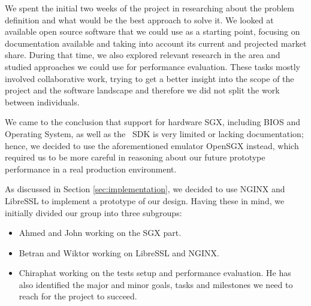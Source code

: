 \documentclass[../main.tex]{subfiles}
\begin{document}

We spent the initial two weeks of the project in researching about the problem
definition and what would be the best approach to solve it. We looked at
available open source software that we could use as a starting point, focusing
on documentation available and taking into account its current and projected
market share. During that time, we also explored relevant research in the area
and studied approaches we could use for performance evaluation. These tasks
mostly involved collaborative work, trying to get a better insight into the
scope of the project and the software landscape and therefore we did not split
the work between individuals.

We came to the conclusion that support for hardware SGX, including BIOS and
Operating System, as well as the \Intel~SDK is very limited or lacking
documentation; hence, we decided to use the aforementioned emulator OpenSGX
instead, which required us to be more careful in reasoning about our future
prototype performance in a real production environment.

As discussed in Section \ref{sec:implementation}, we decided to use NGINX and
LibreSSL to implement a prototype of our design. Having these in
mind, we initially divided our group into three subgroups:

\begin{itemize}
	\item Ahmed and John working on the SGX part.
	\item Betran and Wiktor working on LibreSSL and NGINX.
	\item Chiraphat working on the tests setup and performance evaluation.
          He has also identified the major and minor goals, tasks and
          milestones we need to reach for the project to succeed. %
\end{itemize}


\end{document}
